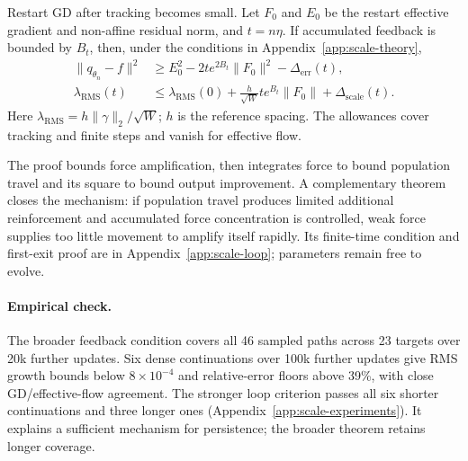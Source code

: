 \begin{theorem}
\label{thm:scale-informal}
Restart GD after tracking becomes small. Let $F_0$ and $E_0$ be the
restart effective gradient and non-affine residual norm, and $t=n\eta$.
If accumulated feedback is bounded by $B_t$, then, under the conditions in
Appendix~\ref{app:scale-theory},
\begin{align}
\|q_{\theta_n}-f\|^2
&\ge E_0^2-2t e^{2B_t}\|F_0\|^2-\Delta_{\mathrm{err}}(t),
\label{eq:scale-main-error}\\
\lambda_{\mathrm{RMS}}(t)
&\le\lambda_{\mathrm{RMS}}(0)
+\frac{h}{\sqrt W}t e^{B_t}\|F_0\|+\Delta_{\mathrm{scale}}(t).
\label{eq:scale-main-rms}
\end{align}
Here $\lambda_{\mathrm{RMS}}=h\|\gamma\|_2/\sqrt W$; $h$ is the
reference spacing. The allowances cover tracking and finite steps and
vanish for effective flow.
\end{theorem}

The proof bounds force amplification, then integrates force to bound
population travel and its square to bound output improvement.
A complementary theorem closes the mechanism: if population travel
produces limited additional reinforcement and accumulated force
concentration is controlled, weak force supplies too little movement
to amplify itself rapidly. Its finite-time condition and first-exit proof
are in Appendix~\ref{app:scale-loop}; parameters remain free to evolve.

\paragraph{Empirical check.}
The broader feedback condition covers all 46 sampled paths across 23
targets over 20k further updates. Six dense continuations over 100k further
updates give RMS growth bounds below $8\times10^{-4}$ and relative-error
floors above 39\%, with close GD/effective-flow agreement. The stronger
loop criterion passes all six shorter continuations and three longer ones
(Appendix~\ref{app:scale-experiments}). It explains a sufficient mechanism
for persistence; the broader theorem retains longer coverage.


